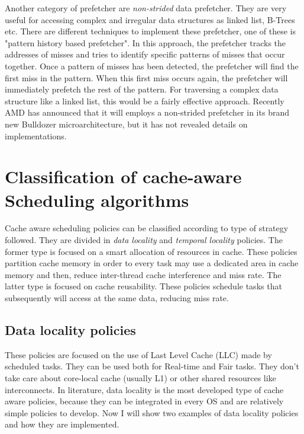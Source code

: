 Another category of prefetcher are \textit{non-strided} data prefetcher. They are very useful for accessing complex and irregular data structures as 
linked list, B-Trees etc. There are different techniques to implement these prefetcher, one of these is "pattern history based prefetcher". 
In this approach, the prefetcher tracks the addresses of misses and tries to identify specific patterns of misses that occur together. 
Once a pattern of misses has been detected, the prefetcher will find the first miss in the pattern. When this first miss occurs again, the prefetcher 
will immediately prefetch the rest of the pattern. For traversing a complex data structure like a linked list, this would be a fairly effective approach.
Recently AMD has announced that it will employs a non-strided prefetcher in its brand new Bulldozer microarchitecture, but it has not revealed details on 
implementations.

\section{Classification of cache-aware Scheduling algorithms}

Cache aware scheduling policies can be classified according to type of strategy followed. They are divided in \textit{data locality} and 
\textit{temporal locality} policies. The former type is focused on a smart allocation of resources in cache. These policies partition cache memory in order
to every task may use a dedicated area in cache memory and then, reduce inter-thread cache interference and miss rate.
The latter type is focused on cache reusability. These policies schedule tasks that subsequently will access at the same data, reducing miss rate.

\subsection{Data locality policies} 

These policies are focused on the use of Last Level Cache (LLC) made by scheduled tasks. They can be used both for Real-time and Fair tasks. 
They don't take care about core-local cache (usually L1) or other shared resources like interconnects. In literature, data locality is the most developed 
type of cache aware policies, because they can be integrated in every OS and are relatively simple policies to develop. Now I will show two examples of 
data locality policies and how they are implemented.

